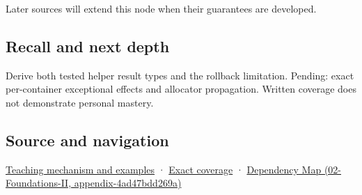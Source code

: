 Later sources will extend this node when their guarantees are developed.

\subsection{Recall and next depth}\label{appendix-c746afaa47d1-recall-and-next-depth}

Derive both tested helper result types and the rollback limitation. Pending: exact per-container exceptional effects and allocator propagation. Written coverage does not demonstrate personal mastery.

\subsection{Source and navigation}\label{appendix-c746afaa47d1-source-and-navigation}

\hyperref[01-foundations-i-ch003-failure-guarantees-shape-the-transfer-algorithm]{Teaching mechanism and examples} · \hyperref[appendix-fd090d982a15-m009---parts-127-147]{Exact coverage} · \href{../02-Foundations-II/main.pdf\#nameddest=appendix-4ad47bdd269a}{Dependency Map (02-Foundations-II, appendix-4ad47bdd269a)}
